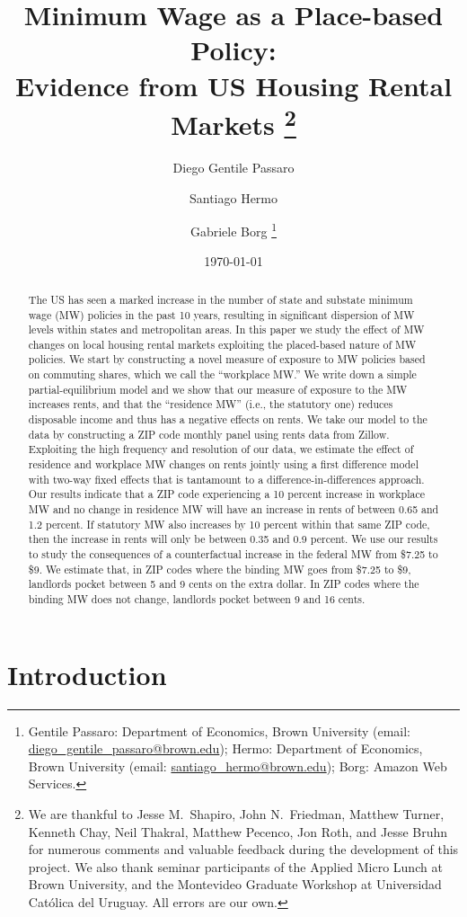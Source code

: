 \documentclass{article}
\title{ Minimum Wage as a Place-based Policy: \\
        Evidence from US Housing Rental Markets
        \thanks{We are thankful to Jesse M.\ Shapiro, John N.\ Friedman, Matthew Turner, 
        Kenneth Chay, Neil Thakral, Matthew Pecenco, Jon Roth, and Jesse Bruhn for numerous 
        comments and valuable feedback during the development of this project.
        We also thank seminar participants of the Applied Micro Lunch at Brown
        University, and the Montevideo Graduate Workshop at Universidad Católica del
        Uruguay.
        All errors are our own.}}
\author{Diego Gentile Passaro \and Santiago Hermo \and Gabriele Borg
        \footnote{Gentile Passaro: Department of Economics, Brown University 
        (email: \url{diego_gentile_passaro@brown.edu}); 
        Hermo: Department of Economics, Brown University 
        (email: \url{santiago_hermo@brown.edu});
        Borg: Amazon Web Services.}}
\date{\today}
\begin{document}
\maketitle

\begin{abstract}
    \noindent
    The US has seen a marked increase in the number of state and substate minimum 
    wage (MW) policies in the past 10 years, resulting in significant dispersion 
    of MW levels within states and metropolitan areas.
    In this paper we study the effect of MW changes on local housing rental 
    markets exploiting the placed-based nature of MW policies.
    We start by constructing a novel measure of exposure to MW policies based on 
    commuting shares, which we call the ``workplace MW.''
    We write down a simple partial-equilibrium model and we show that our measure of 
    exposure to the MW increases rents, and that the ``residence MW'' 
    (i.e., the statutory one) reduces disposable income and thus has a negative effects on rents.
    We take our model to the data by constructing a ZIP code monthly panel using 
    rents data from Zillow.
    Exploiting the high frequency and resolution of our data, we estimate the 
    effect of residence and workplace MW changes on rents jointly 
    using a first difference model with two-way fixed effects that is tantamount
    to a difference-in-differences approach.
    Our results indicate that a ZIP code experiencing a 10 percent increase in 
    workplace MW and no change in residence MW will have an increase in rents of 
    between 0.65 and 1.2 percent. If statutory MW also increases by 10 percent 
    within that same ZIP code, then the increase in rents will only be between 
    0.35 and 0.9 percent.
    We use our results to study the consequences of a counterfactual
    increase in the federal MW from \$7.25 to \$9.
    We estimate that, in ZIP codes where the binding MW goes from \$7.25 to \$9,
    landlords pocket between 5 and 9 cents on the extra dollar. In ZIP codes 
    where the binding MW does not change, landlords pocket between 9 and 16 cents.
\end{abstract}

\vspace{5mm}


\clearpage

\section{Introduction}\label{sec:intro}
    
\end{document}
